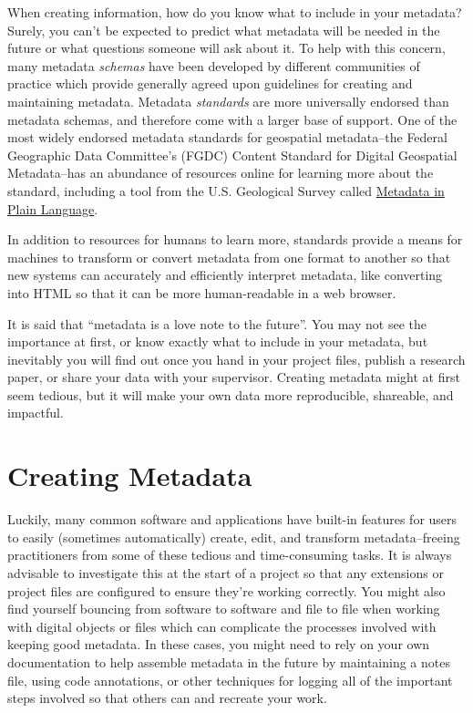 \documentclass[
]{book}
\begin{document}
When creating information, how do you know what to include in your metadata? Surely, you can't be expected to predict what metadata will be needed in the future or what questions someone will ask about it. To help with this concern, many metadata \emph{schemas} have been developed by different communities of practice which provide generally agreed upon guidelines for creating and maintaining metadata. Metadata \emph{standards} are more universally endorsed than metadata schemas, and therefore come with a larger base of support. One of the most widely endorsed metadata standards for geospatial metadata--the Federal Geographic Data Committee's (FGDC) Content Standard for Digital Geospatial Metadata--has an abundance of resources online for learning more about the standard, including a tool from the U.S. Geological Survey called \href{https://geology.usgs.gov/tools/metadata/tools/doc/ctc/}{Metadata in Plain Language}.

In addition to resources for humans to learn more, standards provide a means for machines to transform or convert metadata from one format to another so that new systems can accurately and efficiently interpret metadata, like converting into HTML so that it can be more human-readable in a web browser.

It is said that ``metadata is a love note to the future''. You may not see the importance at first, or know exactly what to include in your metadata, but inevitably you will find out once you hand in your project files, publish a research paper, or share your data with your supervisor. Creating metadata might at first seem tedious, but it will make your own data more reproducible, shareable, and impactful.

\section{Creating Metadata}\label{creating-metadata}

Luckily, many common software and applications have built-in features for users to easily (sometimes automatically) create, edit, and transform metadata--freeing practitioners from some of these tedious and time-consuming tasks. It is always advisable to investigate this at the start of a project so that any extensions or project files are configured to ensure they're working correctly. You might also find yourself bouncing from software to software and file to file when working with digital objects or files which can complicate the processes involved with keeping good metadata. In these cases, you might need to rely on your own documentation to help assemble metadata in the future by maintaining a notes file, using code annotations, or other techniques for logging all of the important steps involved so that others can and recreate your work.
\end{document}
